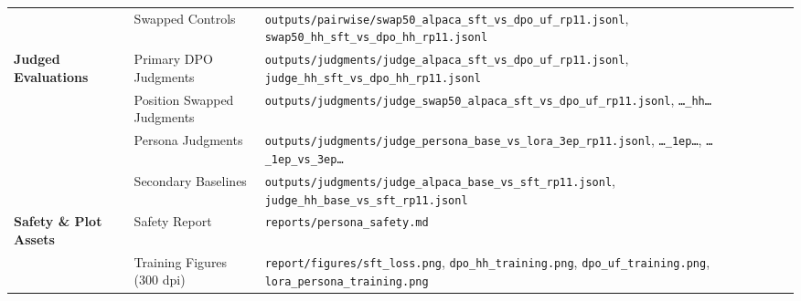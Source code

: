 \begin{table}[t]
\begin{tabularx}{\textwidth}{llX}
& Swapped Controls & \texttt{outputs/pairwise/swap50\_alpaca\_sft\_vs\_dpo\_uf\_rp11.jsonl}, \texttt{swap50\_hh\_sft\_vs\_dpo\_hh\_rp11.jsonl} \\
\textbf{Judged Evaluations} & Primary DPO Judgments & \texttt{outputs/judgments/judge\_alpaca\_sft\_vs\_dpo\_uf\_rp11.jsonl}, \texttt{judge\_hh\_sft\_vs\_dpo\_hh\_rp11.jsonl} \\
& Position Swapped Judgments & \texttt{outputs/judgments/judge\_swap50\_alpaca\_sft\_vs\_dpo\_uf\_rp11.jsonl}, \texttt{\dots\_hh\dots} \\
& Persona Judgments & \texttt{outputs/judgments/judge\_persona\_base\_vs\_lora\_3ep\_rp11.jsonl}, \texttt{\dots\_1ep\dots}, \texttt{\dots\_1ep\_vs\_3ep\dots} \\
& Secondary Baselines & \texttt{outputs/judgments/judge\_alpaca\_base\_vs\_sft\_rp11.jsonl}, \texttt{judge\_hh\_base\_vs\_sft\_rp11.jsonl} \\
\textbf{Safety \& Plot Assets} & Safety Report & \texttt{reports/persona\_safety.md} \\
& Training Figures (300 dpi) & \texttt{report/figures/sft\_loss.png}, \texttt{dpo\_hh\_training.png}, \texttt{dpo\_uf\_training.png}, \texttt{lora\_persona\_training.png} \\
\bottomrule
\end{tabularx}
\end{table}
